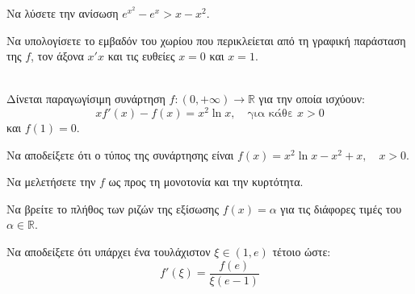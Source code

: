 \documentclass[11pt,a4paper,modern,B]{FFExam}
\begin{document}
\begin{thema}
\begin{erwthma}
\item Να λύσετε την ανίσωση $e^{x^2} - e^x > x - x^2$.
\item Να υπολογίσετε το εμβαδόν του χωρίου που περικλείεται από τη γραφική παράσταση της $f$, τον άξονα $x'x$ και τις ευθείες $x=0$ και $x=1$.
\end{erwthma}
\item\mbox{}\\
Δίνεται παραγωγίσιμη συνάρτηση $f: (0, +\infty) \to \mathbb{R}$ για την οποία ισχύουν:
$$ x f'(x) - f(x) = x^2 \ln x, \quad \text{για κάθε } x > 0 $$
και $f(1) = 0$.
\begin{erwthma}
\item Να αποδείξετε ότι ο τύπος της συνάρτησης είναι $f(x) = x^2 \ln x - x^2 + x, \quad x > 0$.
\item Να μελετήσετε την $f$ ως προς τη μονοτονία και την κυρτότητα.
\item Να βρείτε το πλήθος των ριζών της εξίσωσης $f(x) = \alpha$ για τις διάφορες τιμές του $\alpha \in \mathbb{R}$.
\item Να αποδείξετε ότι υπάρχει ένα τουλάχιστον $\xi \in (1, e)$ τέτοιο ώστε:
$$ f'(\xi) = \dfrac{f(e)}{\xi (e-1)} $$
\end{erwthma}
\end{thema}

\kaliepityxia
\end{document}
